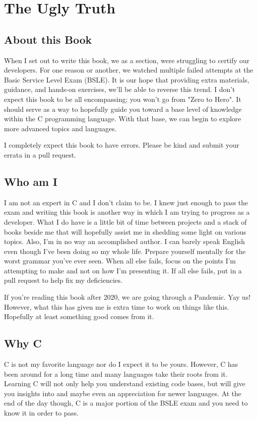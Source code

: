 \documentclass[../main.tex]{subfiles}
\begin{document}
	
\frontmatter
\chapter{The Ugly Truth}
\section{About this Book}

When I set out to write this book, we as a section, were struggling to certify our developers.  For one reason or another, we watched multiple failed attempts at the Basic Service Level Exam (BSLE).  It is our hope that providing extra materials, guidance, and hands-on exercises, we'll be able to reverse this trend.  I don't expect this book to be all encompassing; you won't go from "Zero to Hero".  It should serve as a way to hopefully guide you toward a base level of knowledge within the C programming language.  With that base, we can begin to explore more advanced topics and languages.  

I completely expect this book to have errors.  Please be kind and submit your errata in a pull request.

\section{Who am I}
I am not an expert in C and I don't claim to be.  I knew just enough to pass the exam and writing this book is another way in which I am trying to progress as a developer.  What I do have is a little bit of time between projects and a stack of books beside me that will hopefully assist me in shedding some light on various topics.  Also, I'm in no way an accomplished author.  I can barely speak English even though I've been doing so my whole life.  Prepare yourself mentally for the worst grammar you've ever seen.  When all else fails, focus on the points I'm attempting to make and not on how I'm presenting it.  If all else fails, put in a pull request to help fix my deficiencies.

If you're reading this book after 2020, we are going through a Pandemic.  Yay us!  However, what this has given me is extra time to work on things like this.  Hopefully at least something good comes from it.

\section{Why C}

C is not my favorite language nor do I expect it to be yours.  However, C has been around for a long time and many languages take their roots from it.  Learning C will not only help you understand existing code bases, but will give you insights into and maybe even an appreciation for newer languages.  At the end of the day though, C is a major portion of the BSLE exam and you need to know it in order to pass.

\mainmatter
\end{document}
